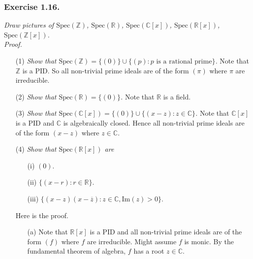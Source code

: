 \documentclass{article}
\begin{document}




\subsubsection*{Exercise 1.16.}
\emph{Draw pictures of
$\mathrm{Spec}(\mathbb{Z})$,
$\mathrm{Spec}(\mathbb{R})$,
$\mathrm{Spec}(\mathbb{C}[x])$,
$\mathrm{Spec}(\mathbb{R}[x])$,
$\mathrm{Spec}(\mathbb{Z}[x])$.} \\



\emph{Proof.}
\begin{enumerate}
\item[(1)]
  \emph{Show that $\mathrm{Spec}(\mathbb{Z}) = \{ (0) \} \cup \{ (p) : \text{$p$ is a rational prime} \}$.}
  Note that $\mathbb{Z}$ is a PID.
  So all non-trivial prime ideals are of the form $(\pi)$ where $\pi$ are irreducible.

\item[(2)]
  \emph{Show that $\mathrm{Spec}(\mathbb{R}) = \{ (0) \}$.}
  Note that $\mathbb{R}$ is a field.

\item[(3)]
  \emph{Show that $\mathrm{Spec}(\mathbb{C}[x]) = \{ (0) \} \cup \{ (x - z) : z \in \mathbb{C} \}$.}
  Note that $\mathbb{C}[x]$ is a PID and $\mathbb{C}$ is algebraically closed.
  Hence all non-trivial prime ideals are of the form $(x - z)$ where $z \in \mathbb{C}$.

\item[(4)]
  \emph{Show that $\mathrm{Spec}(\mathbb{R}[x])$ are}
  \begin{enumerate}
  \item[(i)]
    $(0)$.
  \item[(ii)]
    $\{ (x - r) : r \in \mathbb{R} \}$.
  \item[(iii)]
    $\{ (x - z)(x - \overline{z}) : z \in \mathbb{C}, \mathrm{Im}(z) > 0 \}$.
  \end{enumerate}
  Here is the proof.
  \begin{enumerate}
  \item[(a)]
    Note that $\mathbb{R}[x]$ is a PID and
    all non-trivial prime ideals are of the form $(f)$ where $f$ are irreducible.
    Might assume $f$ is monic.
    By the fundamental theorem of algebra, $f$ has a root $z \in \mathbb{C}$.


\end{enumerate}
\end{enumerate}
\end{document}
